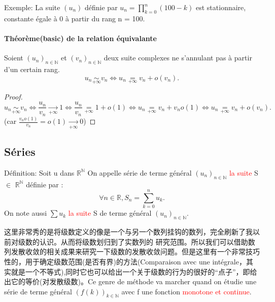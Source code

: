 \documentclass[12pt]{book}
\theoremstyle{definition}\newtheorem{dfn}{Définition}[chapter]
\theoremstyle{plain}\newtheorem{thm}{Théorème}[chapter]
\theoremstyle{plain}\newtheorem{prp}{Proposition}[chapter]
\theoremstyle{plain}\newtheorem{lem}{\bf Lemme}[chapter]
\theoremstyle{plain}\newtheorem{axm}{\bf Axiome}[chapter]
\theoremstyle{plain}\newtheorem{lmm}{\bf Lemme}[chapter]
\theoremstyle{plain}\newtheorem{exm}{\bf Example}[chapter]
\theoremstyle{plain}\newtheorem{cor}{\bf Corollaire}[chapter]
\theoremstyle{remark}\newtheorem{rem}{Remarque}[chapter]
\begin{document}
        Exemple: La suite $(u_n)$ déﬁnie par $u_n = \prod _{k=0}^n(100-k)$ est stationnaire, constante égale à 0 à partir du rang n = 100.

\paragraph{Théorème(basic) de la relation équivalante}
Soient $(u_n)_{n\in \mathbb{N}}$ et  $(v_n)_{n\in \mathbb{N}}$  deux suite complexes ne s'annulant pas à partir d'un certain rang.
$$u_n\underset{+\infty}{\sim} v_n \Longleftrightarrow  u_n \underset{+\infty}{=} v_n + o(v_n).$$
\begin{proof}
        $$u_n\underset{+\infty}{\sim} v_n \Longleftrightarrow  \frac{u_n}{v_n}\xrightarrow[+\infty]{} 1 \Longleftrightarrow  \frac{u_n}{v_n}
\underset{+\infty}{=} 1+o(1)
\Longleftrightarrow  u_n
\underset{+\infty}{=} v_n+v_no(1)
\Longleftrightarrow u_n \underset{+\infty}{=} v_n + o(v_n).$$
(car $\frac{v_no(1)}{v_n}=o(1)\xrightarrow[+\infty]{} 0$)


\end{proof}






        \subsection{Séries}
Définition: Soit u dans	$\mathbb{R}^\mathbb{N}$
On appelle série de terme général $ (u_n)_{n\in\mathbb{N}}$ \textcolor{red}{la suite} S $\in$ $\mathbb{R}^\mathbb{N}$ définie par :
\begin{equation*}
\forall n \in \mathbb{R} , S_n = \sum_{k=0}^{n}u_k.
\end{equation*}
On note aussi $\sum u_k$ \textcolor{red}{la suite} S de terme général $ (u_n)_{n\in\mathbb{N}}$.


这里非常秀的是将级数定义的像是一个与另一个数列挂钩的数列，完全刷新了我以前对级数的认识。从而将级数划归到了实数列的
研究范围。所以我们可以借助数列发散收敛的相关成果来研究一下级数的发散收敛问题。但是这里有一个非常技巧性的，用于确定级数范围(是否有界)的方法(Comparaison avec une intégrale，其实就是一个不等式),同时它也可以给出一个关于级数的行为的很好的“点子”，即给出它的等价(对发散级数)。Ce genre de méthode va marcher quand on étudie une série de terme général $(f(k))_{k\in \mathbb{N}}$ avec f une fonction \textcolor{red}{monotone et continue}.
\end{document}
